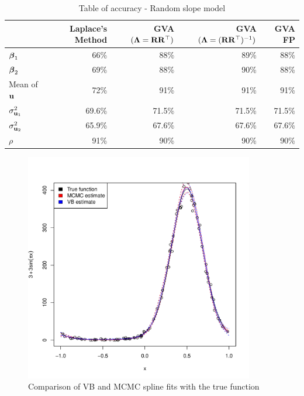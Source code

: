 \documentclass{article}[12pt]
\begin{document}
\begin{table}
\caption{Table of accuracy - Random slope model}
\label{tab:accuracy_slope}
\begin{tabular}{|l|rrrr|}
\hline
& Laplace's Method & GVA $({\boldsymbol \Lambda} = {\bf R} {\bf R}^\top)$ & GVA $({\boldsymbol \Lambda} = ({\bf R} {\bf R}^\top)^{-1})$ & GVA FP\\
\hline
${\boldsymbol \beta}_1$   &66\%&88\%&89\%&88\%\\
${\boldsymbol \beta}_2$   &69\%&88\%&90\%&88\%\\
Mean of ${\bf u}$    &72\%&91\%&91\%&91\%\\
$\sigma^2_{{\bf u}_1}$ &69.6\%&71.5\%&71.5\%&71.5\%\\
$\sigma^2_{{\bf u}_2}$ &65.9\%&67.6\%&67.6\%&67.6\%\\
$\rho$ &91\%&90\%&90\%&90\%\\
\hline
\end{tabular}
\end{table}


\begin{figure}
\label{fig:spline}
\caption{Comparison of VB and MCMC spline fits with the true function}
\includegraphics[width=100mm, height=100mm]{code/results/accuracy_plots_spline_GVA2.pdf}
\end{figure}
\end{document}
